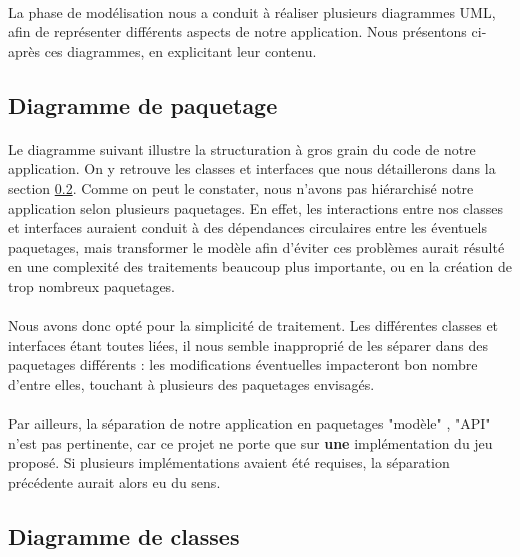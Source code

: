 \documentclass[a4paper]{article}
\begin{document}
\paragraph{}
La phase de modélisation nous a conduit à réaliser plusieurs diagrammes UML, afin de représenter différents aspects de notre application. Nous présentons ci-après ces diagrammes, en explicitant leur contenu.

\subsection{Diagramme de paquetage}
\paragraph{}
Le diagramme suivant illustre la structuration à gros grain du code de notre application. On y retrouve les classes et interfaces que nous détaillerons dans la section \ref{DDC}.
Comme on peut le constater, nous n'avons pas hiérarchisé notre application selon plusieurs paquetages. En effet, les interactions entre nos classes et interfaces auraient conduit à des dépendances circulaires entre les éventuels paquetages, mais transformer le modèle afin d'éviter ces problèmes aurait résulté en une complexité des traitements beaucoup plus importante, ou en la création de trop nombreux paquetages.

\paragraph{}
Nous avons donc opté pour la simplicité de traitement. Les différentes classes et interfaces étant toutes liées, il nous semble inapproprié de les séparer dans des paquetages différents : les modifications éventuelles impacteront bon nombre d'entre elles, touchant à plusieurs des paquetages envisagés.

\paragraph{}
Par ailleurs, la séparation de notre application en paquetages "modèle" , "API" n'est pas pertinente, car ce projet ne porte que sur \textbf{une} implémentation du jeu proposé. Si plusieurs implémentations avaient été requises, la séparation précédente aurait alors eu du sens.



\subsection{Diagramme de classes}
\label{DDC}
\end{document}

